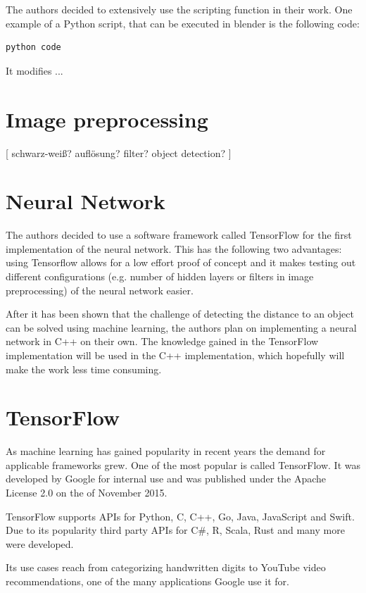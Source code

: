 The authors decided to extensively use the scripting function in their work. One example of a Python script, that can be executed in blender is the following code:

\begin{lstlisting}[language=python]
python code
\end{lstlisting}

It modifies ...

\section{Image preprocessing}


[
schwarz-weiß?
auflösung?
filter?
object detection?
]

\section{Neural Network}
The authors decided to use a software framework called TensorFlow for the first implementation of the neural network. This has the following two advantages: using Tensorflow allows for a low effort proof of concept and it makes testing out different configurations (e.g. number of hidden layers or filters in image preprocessing) of the neural network easier.

After it has been shown that the challenge of detecting the distance to an object can be solved using machine learning, the authors plan on implementing a neural network in C++ on their own. The knowledge gained in the TensorFlow implementation will be used in the C++ implementation, which hopefully will make the work less time consuming.

\section{TensorFlow}
As machine learning has gained popularity in recent years the demand for applicable frameworks grew. One of the most popular is called TensorFlow. It was developed by Google for internal use and was published under the Apache License 2.0 on the  of November 2015.

TensorFlow supports APIs for Python, C, C++, Go, Java, JavaScript and Swift.
Due to its popularity third party APIs for C\#, R, Scala, Rust and many more were developed.

Its use cases reach from categorizing handwritten digits to YouTube video recommendations, one of the many applications Google use it for.

